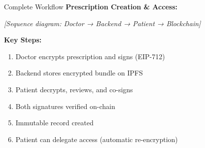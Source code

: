 \documentclass[10pt]{beamer}
\begin{document}
\begin{frame}{Complete Workflow}
\textbf{Prescription Creation \& Access:}

\vspace{0.2cm}
\begin{center}
\textit{[Sequence diagram: Doctor → Backend → Patient → Blockchain]}
\end{center}

\vspace{0.2cm}
\textbf{Key Steps:}
\begin{enumerate}
\item Doctor encrypts prescription and signs (EIP-712)
\item Backend stores encrypted bundle on IPFS
\item Patient decrypts, reviews, and co-signs
\item Both signatures verified on-chain
\item Immutable record created
\item Patient can delegate access (automatic re-encryption)
\end{enumerate}
\end{frame}
\end{document}
